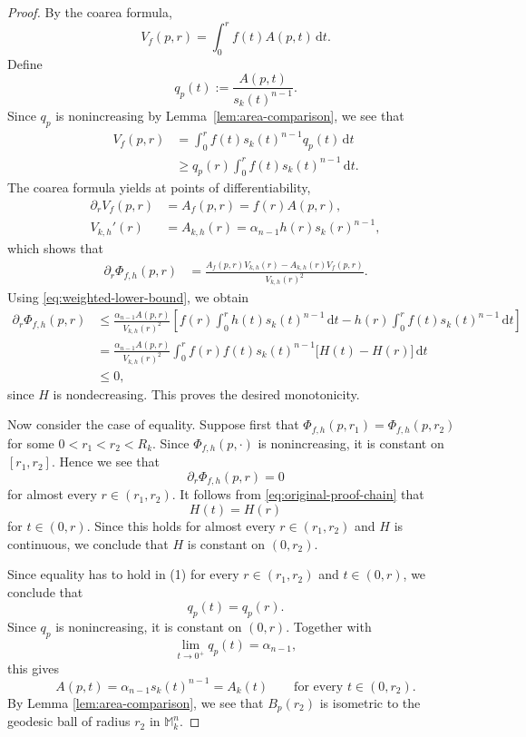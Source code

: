 \documentclass[11pt]{article}
\newcommand{\dd}{\,\mathrm{d}}
\begin{document}
\begin{proof}
By the coarea formula,
\[
V_f(p,r)
=
\int_0^r f(t)A(p,t)\dd t.
\]
Define
\[
q_p(t):=\frac{A(p,t)}{s_k(t)^{n-1}}.
\]
Since $q_p$ is nonincreasing by Lemma~\ref{lem:area-comparison}, we see that
\begin{align}
V_f(p,r)
&=
\int_0^r f(t)s_k(t)^{n-1}q_p(t)\dd t
\nonumber\\
&\geq
q_p(r)
\int_0^r f(t)s_k(t)^{n-1}\dd t.
\label{eq:weighted-lower-bound}
\end{align}
The coarea formula yields at points of differentiability,
\begin{align*}
\partial_r V_f(p,r)&=A_f(p,r)=f(r)A(p,r), \\
V_{k,h}'(r)&=A_{k,h}(r) =\alpha_{n-1}h(r)s_k(r)^{n-1},
\end{align*}
which shows that
\begin{align*}
\partial_r\Phi_{f,h}(p,r)
&=
\frac{
 A_f(p,r)V_{k,h}(r)
 -A_{k,h}(r)V_f(p,r)
}{
 V_{k,h}(r)^2
}.
\end{align*}
Using \eqref{eq:weighted-lower-bound}, we obtain
\begin{align}
\partial_r\Phi_{f,h}(p,r)
&\leq
\frac{\alpha_{n-1}A(p,r)}{V_{k,h}(r)^2}
\left[
 f(r)\int_0^r h(t)s_k(t)^{n-1}\dd t
 -
 h(r)\int_0^r f(t)s_k(t)^{n-1}\dd t
\right]
\nonumber\\
&=
\frac{\alpha_{n-1}A(p,r)}{V_{k,h}(r)^2}
\int_0^r
 f(r)f(t)s_k(t)^{n-1}
 \bigl[H(t)-H(r)\bigr]\dd t
\nonumber\\
&\leq0,
\label{eq:original-proof-chain}
\end{align}
since $H$ is nondecreasing. This proves the desired monotonicity.

Now consider the case of equality. Suppose first that $\Phi_{f,h}(p,r_1)=\Phi_{f,h}(p,r_2)$ for some \(0<r_1<r_2<R_k\). Since \(\Phi_{f,h}(p,\cdot)\) is nonincreasing, it is constant on \([r_1,r_2]\). Hence we see that 
$$\partial_r\Phi_{f,h}(p,r)=0$$
for almost every \(r\in(r_1,r_2)\). It follows from \eqref{eq:original-proof-chain} that
$$H(t)=H(r)$$
for \(t\in(0,r)\). Since this holds for almost every $r\in(r_1,r_2)$ and $H$ is continuous, we conclude that $H$ is constant on $(0,r_2)$.

Since equality has to hold in (1) for every $r \in (r_1, r_2)$ and $t \in (0,r)$, we conclude that
$$
q_p(t)=q_p(r).
$$
Since $q_p$ is nonincreasing, it is constant on \((0,r)\). Together with
\[
\lim_{t\to0^+}q_p(t)=\alpha_{n-1},
\]
this gives
\begin{equation*}
A(p,t)
=
\alpha_{n-1}s_k(t)^{n-1}
=
A_k(t)
\qquad\text{for every }t\in(0,r_2).
\end{equation*}
By Lemma \ref{lem:area-comparison}, we see that $B_p(r_2)$ is isometric to the geodesic ball of radius $r_2$ in $\mathbb{M}_k^n$.










\end{proof}
\end{document}
